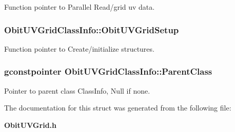 Function pointer to Parallel Read/grid uv data. 

\subsubsection{ {\bf Obit\-UVGrid\-Class\-Info::Obit\-UVGrid\-Setup}}\label{structObitUVGridClassInfo_o15}


Function pointer to Create/initialize structures. 

\subsubsection{\setlength{\rightskip}{0pt plus 5cm}gconstpointer {\bf Obit\-UVGrid\-Class\-Info::Parent\-Class}}\label{structObitUVGridClassInfo_o3}


Pointer to parent class Class\-Info, Null if none. 



The documentation for this struct was generated from the following file:\begin{CompactItemize}
\item 
{\bf Obit\-UVGrid.h}\end{CompactItemize}
